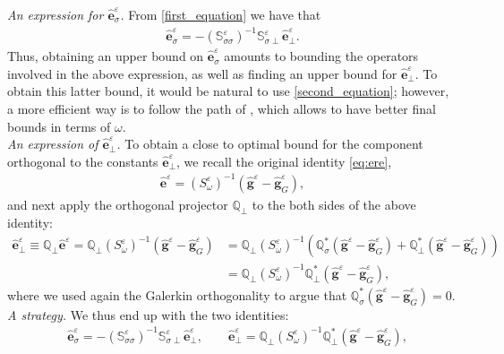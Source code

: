 \documentclass[]{article}
\numberwithin{equation}{section}
\numberwithin{theorem}{section}
\numberwithin{lemma}{section}
\numberwithin{corollary}{section}
\numberwithin{proposition}{section}
\numberwithin{definition}{section}
\newcommand{\re}{\varepsilon}
\renewcommand{\vec}{\boldsymbol}
\begin{document}
	\textit{An expression for $\hat{\vec{e}}^{\re}_{\sigma}$. }From  \eqref{first_equation} we have that
	\begin{align*}
		\hat{\vec{e}}^{\re}_{\sigma} = - (\mathbb{S}^{\re}_{\sigma \sigma})^{-1} \mathbb{S}^{\re}_{ \sigma \perp } \hat{\vec{e}}^{\re}_{\perp}.
	\end{align*}
	Thus, obtaining an upper bound on $\hat{\vec{e}}_{\sigma}^{\re}$ amounts to bounding the operators involved in the above expression, as well as finding an upper bound for $\hat{\vec{e}}^{\re}_{\perp}$. To obtain this latter bound, it would be natural to use \eqref{second_equation}; however, a more efficient way is to follow the path of \cite{MK}, which allows to have better final bounds in terms of $\omega$. \\
	\textit{An expression of $\hat{\vec{e}}^{\re}_{\perp}$. }
	To obtain a close to optimal bound for the component orthogonal to the constants $\hat{\vec{e}}^{\re}_{\perp}$, we recall the original identity \eqref{eq:ere},
	\begin{align*}%
		\hat{\vec{e}}^{\re} = ({S}^{\re}_{\omega})^{-1} (\hat{\vec{g}}^{\re} - \hat{\vec{g}}^{\re}_G ),
	\end{align*}
	and next apply the orthogonal projector $\mathbb{Q}_{\perp}$ to the both sides of the above identity:
	\begin{align*}%
		\hat{\vec{e}}^{\re}_{\perp}\equiv\mathbb{Q}_{\perp} \hat{\vec{e}}^{\re} = \mathbb{Q}_{\perp} (S^{\re}_{\omega})^{-1} (\hat{\vec{g}}^{\re} - \hat{\vec{g}}^{\re}_G ) &= \mathbb{Q}_{\perp} (S^{\re}_{\omega})^{-1} ( \mathbb{Q}^*_{\sigma} (\hat{\vec{g}}^{\re} - \hat{\vec{g}}^{\re}_G) + \mathbb{Q}^*_{\perp} (\hat{\vec{g}}^{\re} - \hat{\vec{g}}^{\re}_G))  \\
		&= \mathbb{Q}_{\perp} (S^{\re}_{\omega})^{-1} \mathbb{Q}^*_{\perp} (\hat{\vec{g}}^{\re} - \hat{\vec{g}}^{\re}_G),
	\end{align*}
	where we used again the Galerkin orthogonality to argue that $\mathbb{Q}^*_{\sigma} (\hat{\vec{g}}^{\re} - \hat{\vec{g}}^{\re}_G) = 0$. \\
	\textit{A strategy. }	
	We thus end up with the two identities:
	\begin{align*}%
		&\hat{\vec{e}}^{\re}_{\sigma} = - (\mathbb{S}^{\re}_{\sigma \sigma})^{-1} \mathbb{S}^{\re}_{ \sigma \perp } \hat{\vec{e}}^{\re}_{\perp}, \qquad
		\hat{\vec{e}}^{\re}_{\perp} = \mathbb{Q}_{\perp} (S^{\re}_{\omega})^{-1} \mathbb{Q}^*_{\perp} (\hat{\vec{g}}^{\re} - \hat{\vec{g}}^{\re}_G),
	\end{align*}
\end{document}
